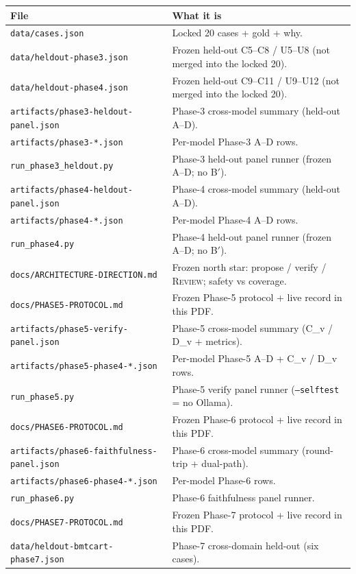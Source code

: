 \documentclass[11pt,a4paper]{article}
\newcommand{\rev}{\textsc{Review}}
\begin{document}
\begin{tabularx}{\textwidth}{@{}l Y@{}}
\toprule
File & What it is \\
\midrule
\texttt{data/cases.json} & Locked 20 cases + gold + why. \\
\texttt{data/heldout-phase3.json} & Frozen held-out C5--C8 / U5--U8 (not merged into the locked 20). \\
\texttt{data/heldout-phase4.json} & Frozen held-out C9--C11 / U9--U12 (not merged into the locked 20). \\
\texttt{artifacts/phase3-heldout-panel.json} & Phase-3 cross-model summary (held-out A--D). \\
\texttt{artifacts/phase3-*.json} & Per-model Phase-3 A--D rows. \\
\texttt{run\_phase3\_heldout.py} & Phase-3 held-out panel runner (frozen A--D; no B$'$). \\
\texttt{artifacts/phase4-heldout-panel.json} & Phase-4 cross-model summary (held-out A--D). \\
\texttt{artifacts/phase4-*.json} & Per-model Phase-4 A--D rows. \\
\texttt{run\_phase4.py} & Phase-4 held-out panel runner (frozen A--D; no B$'$). \\
\texttt{docs/ARCHITECTURE-DIRECTION.md} & Frozen north star: propose / verify / \rev; safety vs coverage. \\
\texttt{docs/PHASE5-PROTOCOL.md} & Frozen Phase-5 protocol + live record in this PDF. \\
\texttt{artifacts/phase5-verify-panel.json} & Phase-5 cross-model summary (C\_v / D\_v + metrics). \\
\texttt{artifacts/phase5-phase4-*.json} & Per-model Phase-5 A--D + C\_v / D\_v rows. \\
\texttt{run\_phase5.py} & Phase-5 verify panel runner (\texttt{--selftest} = no Ollama). \\
\texttt{docs/PHASE6-PROTOCOL.md} & Frozen Phase-6 protocol + live record in this PDF. \\
\texttt{artifacts/phase6-faithfulness-panel.json} & Phase-6 cross-model summary (round-trip + dual-path). \\
\texttt{artifacts/phase6-phase4-*.json} & Per-model Phase-6 rows. \\
\texttt{run\_phase6.py} & Phase-6 faithfulness panel runner. \\
\texttt{docs/PHASE7-PROTOCOL.md} & Frozen Phase-7 protocol + live record in this PDF. \\
\texttt{data/heldout-bmtcart-phase7.json} & Phase-7 cross-domain held-out (six cases). \\

\end{tabularx}
\end{document}

